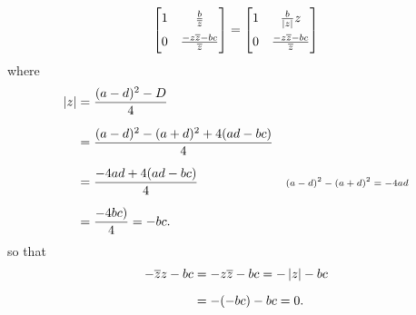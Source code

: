 \documentclass[../MathsNotesBase.tex]{subfiles}
\begin{document}
{\[			\begin{bmatrix}
				1 & \frac{b}{\conj{z}} \nn
				0 & \frac{-z\conj{z} - bc}{\conj{z}}
			\end{bmatrix} =
			\begin{bmatrix}
				1 & \frac{b}{\abs{z}}z \nn
				0 & \frac{-z\conj{z} - bc}{\conj{z}}
			\end{bmatrix}
		\]
		where
		\[\begin{aligned}
			\abs{z} &= \frac{(a-d)^2 - D}{4} \nn
			&= \frac{(a-d)^2 - (a+d)^2 + 4(ad - bc)}{4} \nn
			&= \frac{-4ad + 4(ad - bc)}{4} &\sidecomment{${ (a-d)^2 - (a+d)^2 = -4ad }$} \nn
			&= \frac{-4bc)}{4} = -bc.
		\end{aligned}\]
		so that
		\[\begin{aligned}
			-\conj{z}z - bc &= -z\conj{z} - bc = -\abs{z} - bc \nn
			&= -(-bc) - bc = 0.
		\end{aligned}\]
	
}
\end{document}
